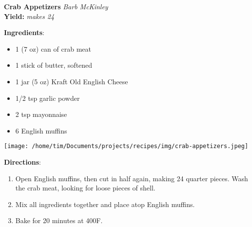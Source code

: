 \documentclass[11pt, twoside, openany]{book}
\begin{document}
\noindent\begin{minipage}[t]{\linewidth}%
{\Large\textbf{Crab Appetizers}} \label{crab-appetizers}\hfill\textit{Barb McKinley}\\
\textbf{Yield:} \textit{makes 24}\\
\noindent\begin{minipage}[t]{0.78\linewidth}%
\textbf{Ingredients}:\vspace{-3mm}
\begin{multicols}{2}
\begin{itemize}\setlength\itemsep{-1mm}
\item 1 (7 oz) can of crab meat
\item 1 stick of butter, softened
\item 1 jar (5 oz) Kraft Old English Cheese
\item 1/2 tsp garlic powder
\item 2 tsp mayonnaise
\item 6 English muffins
\end{itemize}
\end{multicols}
\end{minipage}
\noindent\begin{minipage}[t]{0.18\linewidth}
\centering \strut\vspace*{-\baselineskip}\newline
\texttt{[image: /home/tim/Documents/projects/recipes/img/crab-appetizers.jpeg]}\\
\end{minipage}\vspace{3mm}
\textbf{Directions}:
\vspace{-3mm}\begin{enumerate}\setlength\itemsep{-1mm}
\item Open English muffins, then cut in half again, making 24 quarter pieces. Wash the crab meat, looking for loose pieces of shell.
\item Mix all ingredients together and place atop English muffins.
\item Bake for 20 minutes at 400F.
\end{enumerate}
\end{minipage}\vspace{8mm}
\end{document}
